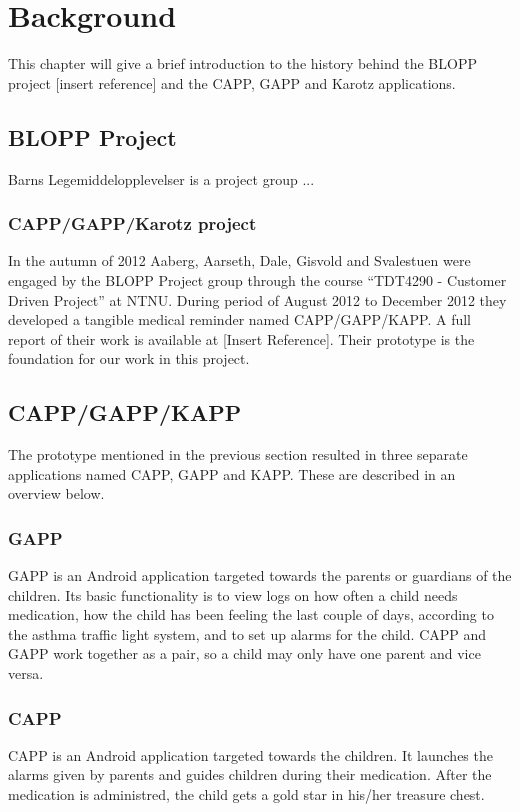 \chapter{Background}
\label{chp:background}


This chapter will give a brief introduction to the history behind the BLOPP project [insert reference] and the CAPP, GAPP and Karotz applications.


\section{BLOPP Project}
\label{sec:bloppproject}
Barns Legemiddelopplevelser is a project group ...

\subsection{CAPP/GAPP/Karotz project}
In the autumn of 2012 Aaberg, Aarseth, Dale, Gisvold and Svalestuen were engaged by the BLOPP Project group through the course ``TDT4290 - Customer Driven Project'' \cite{customerdrivenntnu} at NTNU. During period of August 2012 to December 2012 they developed a tangible medical reminder named CAPP/GAPP/KAPP. A full report of their work is available at [Insert Reference]. 
Their prototype is the foundation for our work in this project.


\section{CAPP/GAPP/KAPP}
\label{sec:cappgappkapp}
The prototype mentioned in the previous section resulted in three separate applications named CAPP, GAPP and KAPP. These are described in an overview below.  

\subsection{GAPP}
GAPP is an Android application targeted towards the parents or guardians of the children. 
Its basic functionality is to view logs on how often a child needs medication, how the child has been feeling the last couple of days, according to the asthma traffic light system, and to set up alarms for the child. 
CAPP and GAPP work together as a pair, so a child may only have one parent and vice versa. %


\subsection{CAPP}
CAPP is an Android application targeted towards the children. It launches the alarms given by parents and guides children during their medication. After the medication is administred, the child gets a gold star in his/her treasure chest.    

